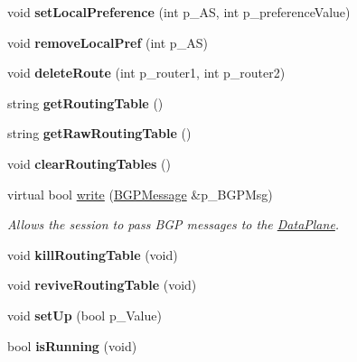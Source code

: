 \begin{DoxyCompactItemize}
\item 
\hypertarget{classRoutingTable_acb0fef81a119d5aa54367bbb817390bb}{void {\bfseries set\-Local\-Preference} (int p\-\_\-\-A\-S, int p\-\_\-preference\-Value)}\label{classRoutingTable_acb0fef81a119d5aa54367bbb817390bb}

\item 
\hypertarget{classRoutingTable_abb0e727faa93499d36b3f234664df133}{void {\bfseries remove\-Local\-Pref} (int p\-\_\-\-A\-S)}\label{classRoutingTable_abb0e727faa93499d36b3f234664df133}

\item 
\hypertarget{classRoutingTable_a5e3c7b755bbc5788388a47d5b3d53e1e}{void {\bfseries delete\-Route} (int p\-\_\-router1, int p\-\_\-router2)}\label{classRoutingTable_a5e3c7b755bbc5788388a47d5b3d53e1e}

\item 
\hypertarget{classRoutingTable_a63a0efbe82ccd53c0e6baa0259c7b10d}{string {\bfseries get\-Routing\-Table} ()}\label{classRoutingTable_a63a0efbe82ccd53c0e6baa0259c7b10d}

\item 
\hypertarget{classRoutingTable_aadac68ca579fe85ce4328d42acbd3e0d}{string {\bfseries get\-Raw\-Routing\-Table} ()}\label{classRoutingTable_aadac68ca579fe85ce4328d42acbd3e0d}

\item 
\hypertarget{classRoutingTable_af938852f430a4483c28e7956136fa2ab}{void {\bfseries clear\-Routing\-Tables} ()}\label{classRoutingTable_af938852f430a4483c28e7956136fa2ab}

\item 
virtual bool \hyperlink{classRoutingTable_ac54104a090c70c3f23799af1f30113e7}{write} (\hyperlink{classBGPMessage}{B\-G\-P\-Message} \&p\-\_\-\-B\-G\-P\-Msg)
\begin{DoxyCompactList}\small\item\em Allows the session to pass B\-G\-P messages to the \hyperlink{classDataPlane}{Data\-Plane}. \end{DoxyCompactList}\item 
\hypertarget{classRoutingTable_a2d688b3f2ced6fa02995086cd7a72872}{void {\bfseries kill\-Routing\-Table} (void)}\label{classRoutingTable_a2d688b3f2ced6fa02995086cd7a72872}

\item 
\hypertarget{classRoutingTable_ad765fbb07c6fdec4e1028a6a75b0762d}{void {\bfseries revive\-Routing\-Table} (void)}\label{classRoutingTable_ad765fbb07c6fdec4e1028a6a75b0762d}

\item 
\hypertarget{classRoutingTable_a9a796af2479afeecf336670f9aaaebd8}{void {\bfseries set\-Up} (bool p\-\_\-\-Value)}\label{classRoutingTable_a9a796af2479afeecf336670f9aaaebd8}

\item 
\hypertarget{classRoutingTable_a528839c68336d265c100de1fab267f8f}{bool {\bfseries is\-Running} (void)}\label{classRoutingTable_a528839c68336d265c100de1fab267f8f}

\end{DoxyCompactItemize}
